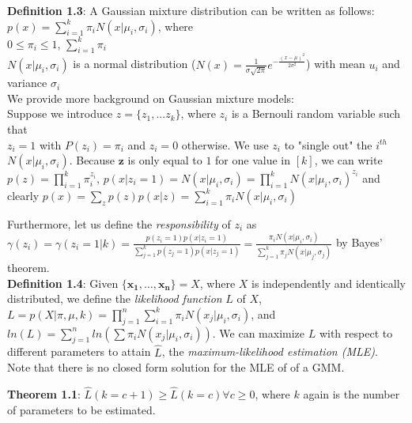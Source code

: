 \documentclass{article}
\begin{document}
\textbf{Definition 1.3}: A Gaussian mixture distribution can be written as follows:\\ \(p(x) = \sum_{i=1}^{k} \pi_i N(x | \mu_i, \sigma_i)\), where \\

\(0 \leq \pi_i \leq 1\), \(\sum_{i=1}^k \pi_i\)\\
\(N(x | \mu_i, \sigma_i)\) is a normal distribution (\(N(x) = \frac{1}{\sigma \sqrt{2\pi}} e^{ - \frac{(x - \mu)^2}{2\sigma^2}}\)) with mean \(u_i\) and variance \(\sigma_i\)\\

We provide more background on Gaussian mixture models:\\

Suppose we introduce \(z = \{z_1, ... z_k\} \), where \(z_i\) is a Bernouli random variable such that\\ \(z_i = 1\) with \(P(z_i) = \pi_i\) and \(z_i = 0\) otherwise. We use \(z_i\) to "single out" the \(i^{th}\) \(N(x | \mu_i, \sigma_i)\). Because \(\bm{z}\) is only equal to \(1\) for one value in \([k]\), we can write \(p(z) = \prod_{i=1}^k \pi_i^{z_i}\),
\(p(x | z_i = 1 ) = N(x | \mu_i, \sigma_i) = \prod_{i=1}^k N(x | \mu_i, \sigma_i)^{z_i}\)
and clearly \(p(x) = \sum_z p(z) p(x | z) = \sum_{i=1}^k \pi_i N(x | \mu_i, \sigma_i)\)

Furthermore, let us define the \textit{responsibility }of \(z_i\) as \(\gamma(z_i) = \gamma(z_i = 1 | k) = \frac{p(z_i = 1)p(x| z_i = 1)}{ \sum_{j=1}^k p(z_j = 1) p(x | z_j = 1) } = \frac{\pi_i N(x | \mu_i, \sigma_i)}{\sum_{j=1}^k \pi_j N(x | \mu_j, \sigma_j)}\) by Bayes' theorem.\\

\textbf{Definition 1.4}: Given \(\{\bm{x_1}, \dots, \bm{x_n} \} = {X}\), where \({X}\) is independently and identically distributed, we define the \textit{likelihood function} \(L\) of \({X}\), \(L = p( X | \pi, \mu, k) = \prod_{j=1}^n \sum_{i=1}^k \pi_i N(x_j | \mu_i, \sigma_i)\), and \(ln(L) = \sum_{j=1}^n ln (\sum \pi_i N(x_j | \mu_i, \sigma_i) )\). We can maximize \(L\) with respect to different parameters to attain \(\hat{L}\), the \textit{maximum-likelihood estimation (MLE)}. \\Note that there is no closed form solution for the MLE of of a  GMM.

\textbf{Theorem 1.1}: \(\hat{L}(k = c+1) \geq \hat{L}(k = c) \forall c\geq 0\), where \(k\) again is the number of parameters to be estimated.\\
\end{document}
